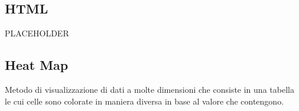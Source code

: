 \documentclass[../glossario.tex]{subfiles}
\begin{document}
\subsection*{HTML}
PLACEHOLDER


\subsection*{Heat Map}
Metodo di visualizzazione di dati a molte dimensioni che consiste in una tabella le cui celle sono colorate in maniera diversa in base al valore che contengono.

    
\end{document}
